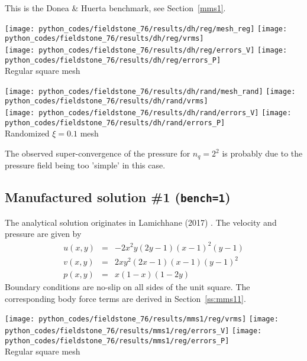 This is the Donea \& Huerta benchmark, see Section~\ref{mms1}.

\begin{center}
\texttt{[image: python\_codes/fieldstone\_76/results/dh/reg/mesh\_reg]}
\texttt{[image: python\_codes/fieldstone\_76/results/dh/reg/vrms]}\\
\texttt{[image: python\_codes/fieldstone\_76/results/dh/reg/errors\_V]}
\texttt{[image: python\_codes/fieldstone\_76/results/dh/reg/errors\_P]}\\
{\captionfont Regular square mesh}
\end{center}

\begin{center}
\texttt{[image: python\_codes/fieldstone\_76/results/dh/rand/mesh\_rand]}
\texttt{[image: python\_codes/fieldstone\_76/results/dh/rand/vrms]}\\
\texttt{[image: python\_codes/fieldstone\_76/results/dh/rand/errors\_V]}
\texttt{[image: python\_codes/fieldstone\_76/results/dh/rand/errors\_P]}\\
{\captionfont Randomized $\xi=0.1$ mesh}
\end{center}

The observed super-convergence of the pressure for $n_q=2^2$ is probably due to the 
pressure field being too 'simple' in this case.

\subsection*{Manufactured solution \#1 ({\tt bench=1})}

The analytical solution originates in Lamichhane (2017) \cite{lami17}.
The velocity and pressure are given by
\begin{eqnarray}
u(x,y)&=&-2x^2y(2y-1)(x-1)^2(y-1) \\
v(x,y)&=& 2xy^2(2x-1)(x-1)(y-1)^2 \\
p(x,y)&=& x(1-x)(1-2y)
\end{eqnarray}
Boundary conditions are no-slip on all sides of the unit square. 
The corresponding body force terms are derived in Section~\ref{ss:mms11}. 

\begin{center}
\texttt{[image: python\_codes/fieldstone\_76/results/mms1/reg/vrms]}
\texttt{[image: python\_codes/fieldstone\_76/results/mms1/reg/errors\_V]}
\texttt{[image: python\_codes/fieldstone\_76/results/mms1/reg/errors\_P]}\\
{\captionfont Regular square mesh}
\end{center}

